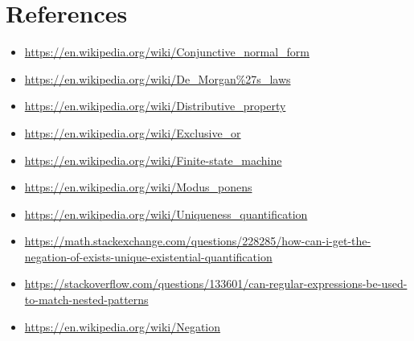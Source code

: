 \documentclass[a4paper, 14pt]{report}
\begin{document}
\hline

\section*{References}

\begin{flushleft}
	\begin{itemize}[noitemsep]
		\item \url{https://en.wikipedia.org/wiki/Conjunctive_normal_form}
		\item \url{https://en.wikipedia.org/wiki/De_Morgan\%27s_laws}
		\item \url{https://en.wikipedia.org/wiki/Distributive_property}
		\item \url{https://en.wikipedia.org/wiki/Exclusive_or}
		\item \url{https://en.wikipedia.org/wiki/Finite-state_machine}
		\item \url{https://en.wikipedia.org/wiki/Modus_ponens}
		\item \url{https://en.wikipedia.org/wiki/Uniqueness_quantification}
		\item \url{https://math.stackexchange.com/questions/228285/how-can-i-get-the-negation-of-exists-unique-existential-quantification}
		\item \url{https://stackoverflow.com/questions/133601/can-regular-expressions-be-used-to-match-nested-patterns}
		\item \url{https://en.wikipedia.org/wiki/Negation}
	\end{itemize}		
\end{flushleft}
\end{document}
